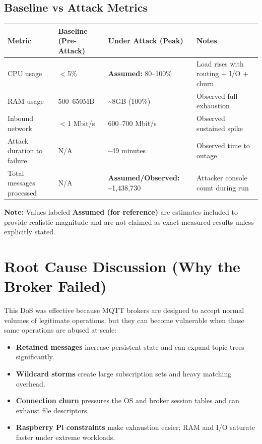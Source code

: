 \documentclass[11pt]{article}
\begin{document}
\subsection{Baseline vs Attack Metrics}
\begin{table}[h]
\centering
\small
\begin{tabularx}{\linewidth}{@{}lXXX@{}}
\toprule
\textbf{Metric} & \textbf{Baseline (Pre-Attack)} & \textbf{Under Attack (Peak)} & \textbf{Notes} \\
\midrule
CPU usage & $<$5\% & \textbf{Assumed:} 80--100\% & Load rises with routing + I/O + churn \\
RAM usage & 500--650MB & \textasciitilde8GB (100\%) & Observed full exhaustion \\
Inbound network & $<$1 Mbit/s & 600--700 Mbit/s & Observed sustained spike \\
Attack duration to failure & N/A & \textasciitilde49 minutes & Observed time to outage \\
Total messages processed & N/A & \textbf{Assumed/Observed:} \textasciitilde1,438,730 & Attacker console count during run \\
\bottomrule
\end{tabularx}
\end{table}

\textbf{Note:} Values labeled \textbf{Assumed (for reference)} are estimates included to provide realistic magnitude and are not claimed as exact measured results unless explicitly stated.

\section{Root Cause Discussion (Why the Broker Failed)}
This DoS was effective because MQTT brokers are designed to accept normal volumes of legitimate operations, but they can become vulnerable when those same operations are abused at scale:
\begin{itemize}
  \item \textbf{Retained messages} increase persistent state and can expand topic trees significantly.
  \item \textbf{Wildcard storms} create large subscription sets and heavy matching overhead.
  \item \textbf{Connection churn} pressures the OS and broker session tables and can exhaust file descriptors.
  \item \textbf{Raspberry Pi constraints} make exhaustion easier; RAM and I/O saturate faster under extreme workloads.
\end{itemize}
\end{document}
